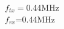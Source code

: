 \documentclass[preview]{standalone}
\begin{document}
\begin{center}
$f_{tx}=$0.44MHz\\$f_{rx}$=0.44MHz
\end{center}
\end{document}
